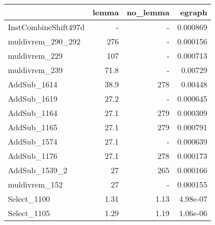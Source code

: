 \begin{tabular}{lrrr}
\toprule
 & lemma & no_lemma & egraph \\
\midrule
InstCombineShift497d & - & - & 0.000869 \\
muldivrem_290_292 & 276 & - & 0.000156 \\
muldivrem_229 & 107 & - & 0.000713 \\
muldivrem_239 & 71.8 & - & 0.00729 \\
AddSub_1614 & 38.9 & 278 & 0.00448 \\
AddSub_1619 & 27.2 & - & 0.000645 \\
AddSub_1164 & 27.1 & 279 & 0.000309 \\
AddSub_1165 & 27.1 & 279 & 0.000791 \\
AddSub_1574 & 27.1 & - & 0.000639 \\
AddSub_1176 & 27.1 & 278 & 0.000173 \\
AddSub_1539_2 & 27 & 265 & 0.000166 \\
muldivrem_152 & 27 & - & 0.000155 \\
Select_1100 & 1.31 & 1.13 & 4.98e-07 \\
Select_1105 & 1.29 & 1.19 & 1.06e-06 \\
\bottomrule
\end{tabular}
